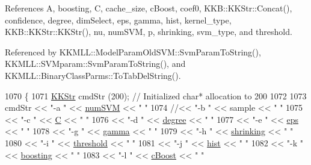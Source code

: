 References A, boosting, C, cache\+\_\+size, c\+Boost, coef0, K\+K\+B\+::\+K\+K\+Str\+::\+Concat(), confidence, degree, dim\+Select, eps, gamma, hist, kernel\+\_\+type, K\+K\+B\+::\+K\+K\+Str\+::\+K\+K\+Str(), nu, num\+S\+VM, p, shrinking, svm\+\_\+type, and threshold.



Referenced by K\+K\+M\+L\+L\+::\+Model\+Param\+Old\+S\+V\+M\+::\+Svm\+Param\+To\+String(), K\+K\+M\+L\+L\+::\+S\+V\+Mparam\+::\+Svm\+Param\+To\+String(), and K\+K\+M\+L\+L\+::\+Binary\+Class\+Parms\+::\+To\+Tab\+Del\+String().


\begin{DoxyCode}
1070 \{
1071   \hyperlink{class_k_k_b_1_1_k_k_str}{KKStr} cmdStr (200); \textcolor{comment}{// Initialized char* allocation to 200}
1072 
1073   cmdStr << \textcolor{stringliteral}{"-a "} << \hyperlink{struct_s_v_m233_1_1svm__parameter_aac6ce26b15ecd7ce74d86a06982fae07}{numSVM}         << \textcolor{stringliteral}{"  "}
1074          \textcolor{comment}{//<< "-b " << sample         << "  "  }
1075          << \textcolor{stringliteral}{"-c "} << \hyperlink{struct_s_v_m233_1_1svm__parameter_a8b864fed529218604af5affb2184b20f}{C}              << \textcolor{stringliteral}{"  "}
1076          << \textcolor{stringliteral}{"-d "} << \hyperlink{struct_s_v_m233_1_1svm__parameter_abb71ffd3ed9223b5239971d18c59f6fe}{degree}         << \textcolor{stringliteral}{"  "}
1077          << \textcolor{stringliteral}{"-e "} << \hyperlink{struct_s_v_m233_1_1svm__parameter_a0805c5f7c672e3a2c36a278d513b674f}{eps}            << \textcolor{stringliteral}{"  "}
1078          << \textcolor{stringliteral}{"-g "} << \hyperlink{struct_s_v_m233_1_1svm__parameter_a39ac3a8cfe2358a6e58ef83ad301019a}{gamma}          << \textcolor{stringliteral}{"  "}
1079          << \textcolor{stringliteral}{"-h "} << \hyperlink{struct_s_v_m233_1_1svm__parameter_a383beec375da659e6a75ebebd95dfa9a}{shrinking}      << \textcolor{stringliteral}{"  "}
1080          << \textcolor{stringliteral}{"-i "} << \hyperlink{struct_s_v_m233_1_1svm__parameter_a7a43eeb6067c4ae3bf32aa151f43195a}{threshold}      << \textcolor{stringliteral}{"  "}
1081          << \textcolor{stringliteral}{"-j "} << \hyperlink{struct_s_v_m233_1_1svm__parameter_a75623b8d630173a2333f37081e94ff13}{hist}           << \textcolor{stringliteral}{"  "}
1082          << \textcolor{stringliteral}{"-k "} << \hyperlink{struct_s_v_m233_1_1svm__parameter_a1c7bc0954f80166ddd404a5eb9e0ca99}{boosting}       << \textcolor{stringliteral}{"  "}
1083          << \textcolor{stringliteral}{"-l "} << \hyperlink{struct_s_v_m233_1_1svm__parameter_a6cc8bcc8a3a7194c22a892bc4a434402}{cBoost}         << \textcolor{stringliteral}{"  "}

\end{DoxyCode}
